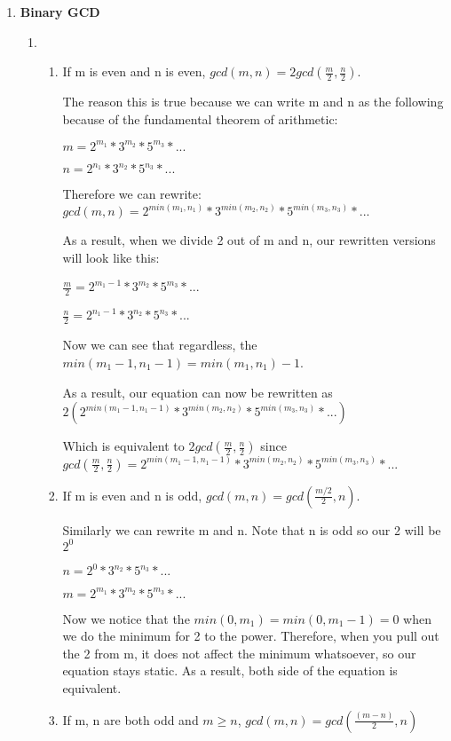 \documentclass[12pt,fleqn]{article}
\begin{document}
\begin{enumerate}
  
  \newpage
  \item \textbf{Binary GCD}
  \begin{enumerate}
    \item 
	\begin{enumerate}
		\item If m is even and n is even, $gcd(m,n) = 2gcd(\frac{m}{2}, \frac{n}{2})$.
		
		The reason this is true because we can write m and n as the following because of the fundamental theorem of arithmetic:
		
		$m = 2^{m_1} * 3^{m_2} * 5^{m_3} * ...$
		
		$n = 2^{n_1} * 3^{n_2} * 5^{n_3} * ...$
		
		Therefore we can rewrite: $gcd(m,n) = 2^{min(m_1, n_1)} * 3^{min(m_2, n_2)} * 5^{min(m_3, n_3)} * ... $
		
		As a result, when we divide 2 out of m and n, our rewritten versions will look like this:
		
		$\frac{m}{2} = 2^{m_1-1} * 3^{m_2} * 5^{m_3} * ...$
		
		$\frac{n}{2} = 2^{n_1-1} * 3^{n_2} * 5^{n_3} * ...$
		
		Now we can see that regardless, the $min(m_1 - 1, n_1 - 1) = min(m_1, n_1) - 1$. 
		
		As a result, our equation can now be rewritten as $2(2^{min(m_1-1, n_1-1)} * 3^{min(m_2, n_2)} * 5^{min(m_3, n_3)} * ... )$
		
		Which is equivalent to $2gcd(\frac{m}{2}, \frac{n}{2})$ since $gcd(\frac{m}{2}, \frac{n}{2}) = 2^{min(m_1-1, n_1-1)} * 3^{min(m_2, n_2)} * 5^{min(m_3, n_3)} * ... $
		
		\item If m is even and n is odd, $gcd(m,n) = gcd(\frac{m/2}{2}, n)$.
		
		Similarly we can rewrite m and n. Note that n is odd so our 2 will be $2^0$
		
		$n = 2^0 * 3^{n_2} * 5^{n_3} * ... $
		
		$m = 2^{m_1} * 3^{m_2} * 5^{m_3} * ... $
		
		Now we notice that the $min(0, m_1) = min(0, m_1 - 1) = 0$ when we do the minimum for 2 to the power. Therefore, when you pull out the 2 from m, it does not affect the minimum whatsoever, so our equation stays static. As a result, both side of the equation is equivalent.
		
		\item If m, n are both odd and $m \geq n$, $gcd(m,n) = gcd(\frac{(m-n)}{2}, n)$
		

\end{enumerate}
\end{enumerate}
\end{enumerate}
\end{document}

